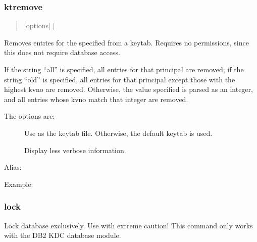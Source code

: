 \documentclass[letterpaper,10pt,english]{sphinxmanual}
\begin{document}
\subsubsection{ktremove}
\label{\detokenize{admin/admin_commands/kadmin_local:id18}}\label{\detokenize{admin/admin_commands/kadmin_local:ktremove}}\begin{quote}

 {[}options{]}  {[} \textbar{}  \textbar{} \sphinxstyleemphasis{old}{]}
\end{quote}

Removes entries for the specified  from a keytab.  Requires
no permissions, since this does not require database access.

If the string “all” is specified, all entries for that principal are
removed; if the string “old” is specified, all entries for that
principal except those with the highest kvno are removed.  Otherwise,
the value specified is parsed as an integer, and all entries whose
kvno match that integer are removed.

The options are:
\begin{description}
\item[{ }] \leavevmode
Use  as the keytab file.  Otherwise, the default keytab is
used.

\item[{}] \leavevmode
Display less verbose information.

\end{description}

Alias: 

Example:

%
\begin{sphinxVerbatim}[commandchars=\\\{\}]
   
         
\end{sphinxVerbatim}


\subsubsection{lock}
\label{\detokenize{admin/admin_commands/kadmin_local:lock}}
Lock database exclusively.  Use with extreme caution!  This command
only works with the DB2 KDC database module.
\end{document}

